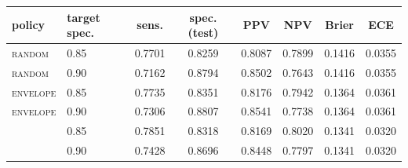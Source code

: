 \begin{tabular}{llcccccc}
\toprule
policy & target spec. & sens. & spec. (test) & PPV & NPV & Brier & ECE \\
\midrule
\textsc{random} & 0.85 & 0.7701 & 0.8259 & 0.8087 & 0.7899 & 0.1416 & 0.0355 \\
\textsc{random} & 0.90 & 0.7162 & 0.8794 & 0.8502 & 0.7643 & 0.1416 & 0.0355 \\
\textsc{envelope} & 0.85 & 0.7735 & 0.8351 & 0.8176 & 0.7942 & 0.1364 & 0.0361 \\
\textsc{envelope} & 0.90 & 0.7306 & 0.8807 & 0.8541 & 0.7738 & 0.1364 & 0.0361 \\
\ArmBest{} & 0.85 & 0.7851 & 0.8318 & 0.8169 & 0.8020 & 0.1341 & 0.0320 \\
\ArmBest{} & 0.90 & 0.7428 & 0.8696 & 0.8448 & 0.7797 & 0.1341 & 0.0320 \\
\bottomrule
\end{tabular}

